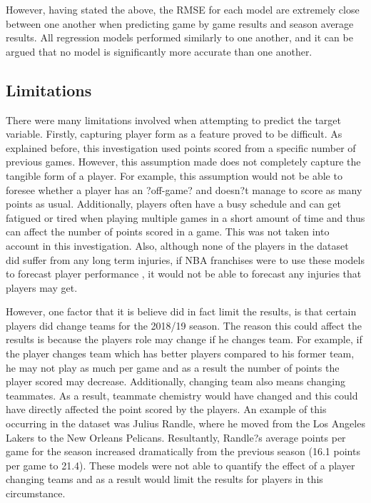 \documentclass[a4paper,11pt,twoside]{article}
\begin{document}
However, having stated the above, the RMSE for each model are extremely close between one another when predicting game by game results and season average results. All regression models performed similarly to one another, and it  can be argued that no model is significantly more accurate than one another.


\subsection{Limitations}
There were many limitations involved when attempting to predict the target variable. Firstly, capturing player form as a feature proved to be difficult. As explained before, this investigation used points scored from a specific number of previous games. However, this assumption made does not completely capture the tangible form of a player. For example, this assumption would not be able to foresee whether a player has an ?off-game? and doesn?t manage to score as many points as usual. Additionally, players often have a busy schedule and can get fatigued or tired when playing multiple games in a short amount of time and thus can affect the number of points scored in a game. This was not taken into account in this investigation. Also, although none of the players in the dataset did suffer from any long term injuries, if NBA franchises were to use these models to forecast player performance , it would not be able to forecast any injuries that players may get. 

However, one factor that it is believe did in fact limit the results, is that certain players did change teams for the 2018/19 season. The reason this could affect the results is because the players role may change if he changes team. For example, if the player changes team which has better players compared to his former team, he may not play as much per game and as a result the number of points the player scored may decrease. Additionally, changing team also means changing teammates. As a result, teammate chemistry would have changed and this could have directly affected the point scored by the players. An example of this occurring in the dataset was Julius Randle, where he moved from the Los Angeles Lakers to the New Orleans Pelicans. Resultantly, Randle?s average points per game for the season increased dramatically from the previous season (16.1 points per game to 21.4). These models were not able to quantify the effect of a player changing teams and as a result would limit the results for players in this circumstance.
\end{document}
